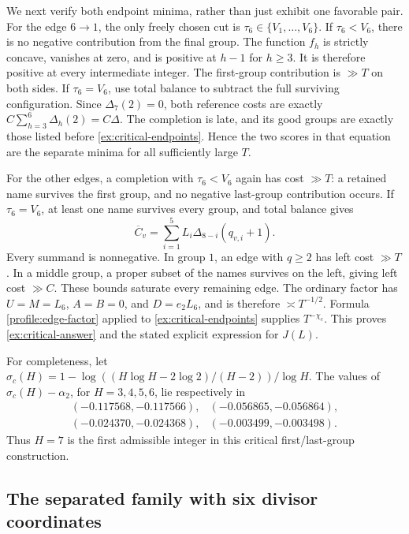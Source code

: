 We next verify both endpoint minima, rather than just exhibit one
favorable pair.  For the edge \(6\to1\), the only freely chosen cut
is \(\tau_6\in\{V_1,\ldots,V_6\}\).  If \(\tau_6<V_6\), there is
no negative contribution from the final group.  The function \(f_h\)
is strictly concave, vanishes at zero, and is positive at \(h-1\)
for \(h\ge3\).  It is therefore positive at every intermediate
integer.  The first-group contribution is \(\gg T\) on both sides.
If \(\tau_6=V_6\), use total balance to subtract the full surviving
configuration.  Since \(\Delta_7(2)=0\), both reference costs are
exactly \(C\sum_{h=3}^6\Delta_h(2)=C\Delta\).  The completion is
late, and its good groups are exactly those listed before
\eqref{ex:critical-endpoints}.  Hence the two scores in that equation
are the separate minima for all sufficiently large \(T\).

For the other edges, a completion with \(\tau_6<V_6\) again has cost
\(\gg T\): a retained name survives the first group, and no negative
last-group contribution occurs.  If \(\tau_6=V_6\), at least one
name survives every group, and total balance gives
\begin{equation}
 \overline C_v=\sum_{i=1}^5L_i
          \Delta_{8-i}(q_{v,i}+1).
 \label{exapp:critical-context}
\end{equation}
Every summand is nonnegative.  In group \(1\), an edge with
\(q\ge2\) has left cost \(\gg T\).  In a middle group, a proper
subset of the names survives on the left, giving left cost \(\gg C\).
These bounds saturate every remaining edge.  The ordinary factor has
\(U=M=L_6\), \(A=B=0\), and \(D=e_2L_6\), and is therefore
\(\asymp T^{-1/2}\).  Formula \eqref{profile:edge-factor} applied
to \eqref{ex:critical-endpoints} supplies \(T^{-\chi_c}\).
This proves \eqref{ex:critical-answer} and the stated explicit
expression for \(J(L)\).

For completeness, let
\(\sigma_c(H)=1-\log((H\log H-2\log2)/(H-2))/\log H\).
The values of \(\sigma_c(H)-\alpha_2\), for \(H=3,4,5,6\), lie
respectively in
\[
 \begin{array}{cc}
 (-0.117568,-0.117566),&(-0.056865,-0.056864),\\
 (-0.024370,-0.024368),&(-0.003499,-0.003498).
 \end{array}
\]
Thus \(H=7\) is the first admissible integer in this critical
first/last-group construction.

\subsection{The separated family with six divisor coordinates}

